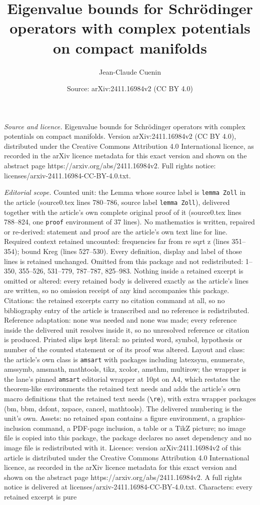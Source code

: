 \documentclass[10pt,a4paper]{amsart}
\title[Eigenvalue bounds for Schr\"odinger operators with complex p]{Eigenvalue bounds for Schr\"odinger operators with complex potentials on compact manifolds}
\author{Jean-Claude Cuenin}
\date{Source: arXiv:2411.16984v2 (CC BY 4.0)}
\begin{document}
\maketitle

\noindent\emph{Source and licence.} Eigenvalue bounds for Schr\"odinger operators with complex potentials on compact manifolds. Version arXiv:2411.16984v2 (CC BY 4.0), distributed under the Creative Commons Attribution 4.0 International licence, as recorded in the arXiv licence metadata for this exact version and shown on the abstract page https://arxiv.org/abs/2411.16984v2. Full rights notice: licenses/arxiv-2411.16984-CC-BY-4.0.txt.\par\smallskip

\noindent\textit{Editorial scope.} Counted unit: the Lemma whose source label is \texttt{lemma Zoll} in the article (source0.tex lines 780--786, source label \texttt{lemma Zoll}), delivered together with the article's own complete original proof of it (source0.tex lines 788--824, one \texttt{proof} environment of 37 lines). No mathematics is written, repaired or re-derived: statement and proof are the article's own text line for line. Required context retained uncounted: frequencies far from re sqrt z (lines 351--354); bound Kreg (lines 527--530). Every definition, display and label of those lines is retained unchanged. Omitted from this package and not redistributed: 1--350, 355--526, 531--779, 787--787, 825--983. Nothing inside a retained excerpt is omitted or altered: every retained body is delivered exactly as the article's lines are written, so no omission receipt of any kind accompanies this package. Citations: the retained excerpts carry no citation command at all, so no bibliography entry of the article is transcribed and no reference is redistributed. Reference adaptation: none was needed and none was made; every reference inside the delivered unit resolves inside it, so no unresolved reference or citation is produced. Printed slips kept literal: no printed word, symbol, hypothesis or number of the counted statement or of its proof was altered. Layout and class: the article's own class is \texttt{amsart} with packages including latexsym, enumerate, amssymb, amsmath, mathtools, tikz, xcolor, amsthm, multirow; the wrapper is the lane's pinned \texttt{amsart} editorial wrapper at 10pt on A4, which restates the theorem-like environments the retained text needs and adds the article's own macro definitions that the retained text needs (\texttt{\textbackslash re}), with extra wrapper packages (bm, bbm, dsfont, xspace, cancel, mathtools). The delivered numbering is the unit's own. Assets: no retained span contains a figure environment, a graphics-inclusion command, a PDF-page inclusion, a table or a TikZ picture; no image file is copied into this package, the package declares no asset dependency and no image file is redistributed with it. Licence: version arXiv:2411.16984v2 of this article is distributed under the Creative Commons Attribution 4.0 International licence, as recorded in the arXiv licence metadata for this exact version and shown on the abstract page https://arxiv.org/abs/2411.16984v2. A full rights notice is delivered at licenses/arxiv-2411.16984-CC-BY-4.0.txt. Characters: every retained excerpt is pure 
\end{document}

